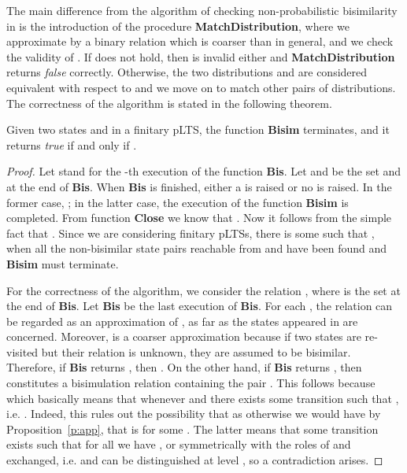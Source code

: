 \documentclass{article}
\begin{document}
The main difference from the algorithm of checking non-probabilistic
bisimilarity in \cite{Lin98} is the introduction of the procedure
\textbf{MatchDistribution}, where we approximate
 by a  binary relation  which is coarser than 
in general, and we check the validity of .
If  does not hold, then
 is invalid either and
\textbf{MatchDistribution} returns \textit{false}
correctly. Otherwise, the two distributions  and 
are considered equivalent with respect to  and we move on to
match other pairs of distributions. The correctness of the algorithm
is stated in the following theorem.

\begin{theorem}\label{t:correctness}
Given two states  and  in a finitary pLTS, the function
\textbf{Bisim} terminates, and it returns \emph{true} if
and only if .
\end{theorem}
\begin{proof}
Let  stand for the -th execution of the function
\textbf{Bis}. Let  and  be the set 
and  at the end of \textbf{Bis}. When \textbf{Bis}
is finished, either a  is raised or no
 is raised. In the former case, ; in the latter case, the execution of the
function \textbf{Bisim} is completed. From function \textbf{Close}
we know that . Now it
follows from the simple fact 
that . Since we are considering
finitary pLTSs, there is some  such that
, when all the non-bisimilar state pairs
reachable from  and  have been found and \textbf{Bisim}
must terminate.

For the correctness of the algorithm, we consider the relation
, where  is the set
 at the end of \textbf{Bis}. Let \textbf{Bis} be
the last execution of \textbf{Bis}. For each , the relation
 can be regarded as an approximation of , as  far as
the states appeared in  are concerned. Moreover, 
is a coarser approximation because if two states  are
re-visited but their relation is unknown, they are assumed to be
bisimilar. Therefore, if \textbf{Bis} returns ,
then . On the other hand, if
\textbf{Bis} returns , then  constitutes
a bisimulation relation containing the pair . This
follows because   which basically
means that whenever  and  there exists
some transition  such that
, i.e.
. Indeed, this rules out the possibility
that  as otherwise we would have
 by Proposition~\ref{p:app}, that is
 for some . The latter means that some
transition  exists such that for all
 we have , or
symmetrically with the roles of  and  exchanged, i.e.
 and  can be distinguished at level , so a
contradiction arises.
\end{proof}
\end{document}
